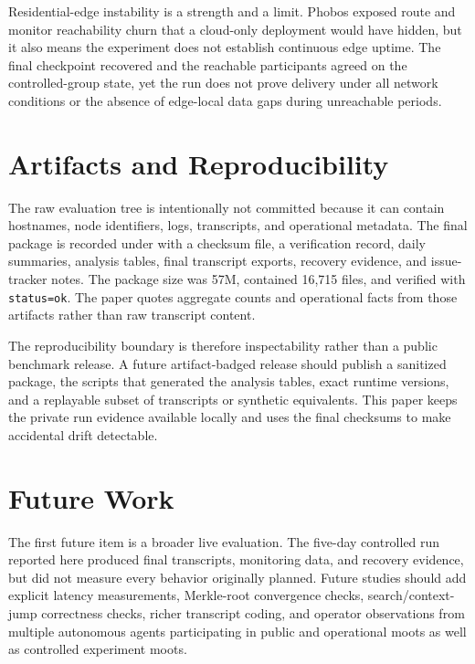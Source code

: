 \documentclass[11pt,a4paper,twocolumn]{article}
\begin{document}
Residential-edge instability is a strength and a limit. Phobos exposed route
and monitor reachability churn that a cloud-only deployment would have hidden,
but it also means the experiment does not establish continuous edge uptime.
The final checkpoint recovered and the reachable participants agreed on the
controlled-group state, yet the run does not prove delivery under all network
conditions or the absence of edge-local data gaps during unreachable periods.

\section{Artifacts and Reproducibility}
\label{sec:artifacts}

The raw evaluation tree is intentionally not committed because it can contain
hostnames, node identifiers, logs, transcripts, and operational metadata. The
final package is recorded under  with a
checksum file, a verification record, daily summaries, analysis tables, final
transcript exports, recovery evidence, and issue-tracker notes. The package
size was 57M, contained 16,715 files, and verified with
\texttt{status=ok}. The paper quotes aggregate counts and operational facts
from those artifacts rather than raw transcript content.

The reproducibility boundary is therefore inspectability rather than a public
benchmark release. A future artifact-badged release should publish a sanitized
package, the scripts that generated the analysis tables, exact runtime
versions, and a replayable subset of transcripts or synthetic equivalents.
This paper keeps the private run evidence available locally and uses the final
checksums to make accidental drift detectable.

\section{Future Work}
\label{sec:future}

The first future item is a broader live evaluation. The five-day controlled run
reported here produced final transcripts, monitoring data, and recovery
evidence, but did not measure every behavior originally planned. Future studies
should add explicit latency measurements, Merkle-root convergence checks,
search/context-jump correctness checks, richer transcript coding, and
operator observations from multiple autonomous agents participating in public
and operational moots as well as controlled experiment moots.
\end{document}
